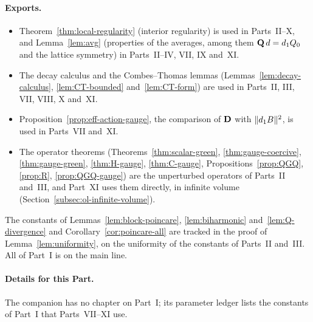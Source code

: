 \paragraph{Exports.}
\begin{itemize}
\item Theorem~\ref{thm:local-regularity} (interior regularity) is used in Parts~II--X, and Lemma~\ref{lem:avg} (properties of the averages, among them $\mathbf Q\,d=d_1 Q_0$ and the lattice symmetry) in Parts~II--IV, VII, IX and~XI.
\item The decay calculus and the Combes--Thomas lemmas (Lemmas~\ref{lem:decay-calculus}, \ref{lem:CT-bounded} and~\ref{lem:CT-form}) are used in Parts~II, III, VII, VIII, X and~XI.
\item Proposition~\ref{prop:eff-action-gauge}, the comparison of $\mathbf D$ with $\|d_1 B\|^2$, is used in Parts~VII and~XI.
\item The operator theorems (Theorems~\ref{thm:scalar-green}, \ref{thm:gauge-coercive}, \ref{thm:gauge-green}, \ref{thm:H-gauge}, \ref{thm:C-gauge}, Propositions~\ref{prop:QGQ}, \ref{prop:R}, \ref{prop:QGQ-gauge}) are the unperturbed operators of Parts~II and~III, and Part~XI uses them directly, in infinite volume (Section~\ref{subsec:ol-infinite-volume}).
\end{itemize}
The constants of Lemmas~\ref{lem:block-poincare}, \ref{lem:biharmonic} and~\ref{lem:Q-divergence} and Corollary~\ref{cor:poincare-all} are tracked in the proof of Lemma~\ref{lem:uniformity}, on the uniformity of the constants of Parts~II and~III. All of Part~I is on the main line.

\paragraph{Details for this Part.} The companion has no chapter on Part~I; its parameter ledger lists the constants of Part~I that Parts~VII--XI use.
